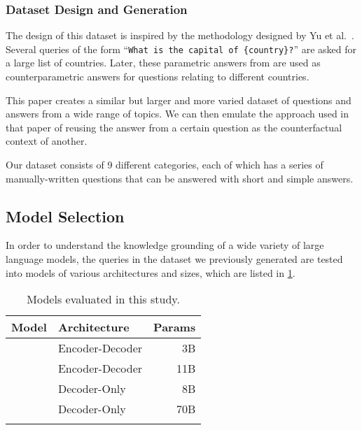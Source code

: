 \subsubsection{Dataset Design and Generation}

The design of this dataset is inspired by the methodology designed by Yu et al.~\cite{factual_recall}.
Several queries of the form ``\texttt{What is the capital of \{country\}?}'' are asked for a large list of countries.
Later, these parametric answers from are used as counterparametric answers for questions relating to different countries.

This paper creates a similar but larger and more varied dataset of questions and answers from a wide range of topics.
We can then emulate the approach used in that paper of reusing the answer from a certain question as the counterfactual context of another.

Our dataset consists of 9 different categories, each of which has a series of manually-written questions that can be answered with short and simple answers.

\subsection{Model Selection}
\label{model_selection}

In order to understand the knowledge grounding of a wide variety of large language
models, the queries in the dataset we previously generated are tested into models of various architectures and sizes, which are listed in \cref{model_list}.

\begin{table}[htb]
	\centering
	\footnotesize
	\begin{tabular}{l l r}
		\toprule
			Model             & Architecture    & Params \\
		\midrule
			\smallflan{}      & Encoder-Decoder & 3B          \\
			\bigflan{}        & Encoder-Decoder & 11B         \\
			\smallllama{}    & Decoder-Only    & 8B          \\
			\bigllama{} & Decoder-Only    & 70B         \\
		\bottomrule \addlinespace[4pt]
	\end{tabular}
	\caption{Models evaluated in this study.}
	\label{model_list}
\end{table}



